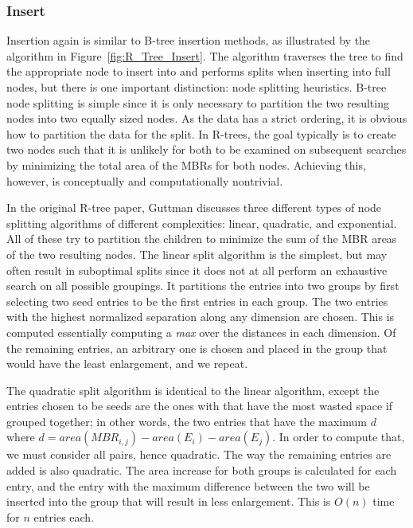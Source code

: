\subsubsection{Insert}
Insertion again is similar to B-tree insertion methods, as illustrated by the 
algorithm in Figure~\ref{fig:R_Tree_Insert}. The algorithm traverses the tree 
to find the appropriate node to insert into and performs splits when inserting
into full nodes, but there is one important distinction: node splitting 
heuristics. B-tree node splitting is simple since it is only necessary to 
partition the two resulting nodes into two equally sized nodes.
As the data has a strict ordering, it is obvious how to partition the data for the split.
In R-trees, the 
goal typically is to create two nodes such that it is unlikely for both to be
examined on subsequent searches by minimizing the total area of the MBRs for
both nodes.
Achieving this, however, is conceptually and computationally nontrivial.

In the original R-tree paper, Guttman discusses three different types of node 
splitting algorithms of different complexities: linear, quadratic, and 
exponential.
All of these try to partition the children to minimize the sum of the MBR areas of the two resulting nodes.
The linear split algorithm is the simplest, but may often
result in suboptimal splits since it does not at all perform an exhaustive search on
all possible groupings. It partitions the entries into two groups by first 
selecting two seed entries to be the first entries in each group.
The two entries with the highest normalized separation along any dimension are chosen.
This is computed essentially computing a \emph{max} over the distances in each dimension.
Of the remaining entries, an arbitrary one is chosen and placed in the group that 
would have the least enlargement, and we repeat.

The quadratic split algorithm is identical to the linear algorithm, except the 
entries chosen to be seeds are the ones with that have the most wasted space
if grouped together; in other words, the two entries that have the maximum $d$
where $d = area(MBR_{i,j}) - area(E_{i}) - area(E_{j}) $.
In order to compute that, we must consider all pairs, hence quadratic.
The way the remaining entries are added is also quadratic. 
The area increase for both groups is calculated for each
entry, and the entry with the maximum difference between the two will be inserted 
into the group that will result in less enlargement.
This is $O(n)$ time for $n$ entries each.

